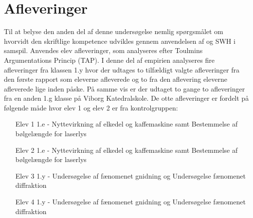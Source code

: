 \section{Afleveringer}
\label{sec:afv}
Til at belyse den anden del af denne undersøgelse nemlig spørgsmålet om hvorvidt den skriftlige kompetence udvikles gennem anvendelsen af \ib{} og SWH i samspil. Anvendes elev afleveringer, som analyseres efter Toulmins Argumentations Princip (TAP). I denne del af empirien analyseres fire afleveringer fra klassen 1.y hvor der udtages to tilfældigt valgte afleveringer fra den første rapport som eleverne afleverede og to fra den aflevering eleverne afleverede lige inden påske. På samme vis er der udtaget to gange to afleveringer fra en anden 1.g klasse på Viborg Katedralskole.
De otte afleveringer er fordelt på følgende måde hvor elev 1 og elev 2 er fra kontrolgruppen: 
\begin{enumerate}
	\item[Elev 1] 1.e - Nyttevirkning af elkedel og kaffemaskine samt Bestemmelse af bølgelængde for laserlys\vspace{-15pt}
	\item[Elev 2] 1.e - Nyttevirkning af elkedel og kaffemaskine samt Bestemmelse af bølgelængde for laserlys\vspace{-15pt}
	\item[Elev 3] 1.y - Undersøgelse af fænomenet gnidning og Undersøgelse fænomenet diffraktion\vspace{-15pt}
	\item[Elev 4] 1.y - Undersøgelse af fænomenet gnidning og Undersøgelse fænomenet diffraktion
\end{enumerate}

